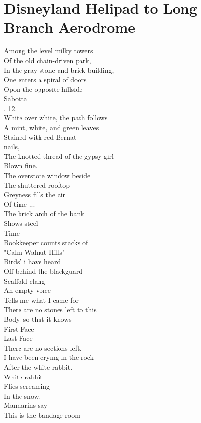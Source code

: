 \documentclass[smalldemyvopaper,11pt,twoside,onecolumn,openright,extrafontsizes]{memoir}
\begin{document}
\chapter{Disneyland Helipad to Long Branch Aerodrome}
Among the level milky towers
\\Of the old chain-driven park,
\\In the gray stone and brick building,
\\One enters a spiral of doors
\\Opon the opposite hillside
\\Sabotta
\\, 12.
\\White over white, the path follows
\\A mint, white, and green leaves
\\Stained with red Bernat
\\nails,
\\The knotted thread of the gypsy girl
\\Blown fine.
\\The overstore window beside
\\The shuttered rooftop
\\Greyness fills the air
\\Of time ...
\\The brick arch of the bank
\\Shows steel
\\Time
\\Bookkeeper counts stacks of
\\"Calm Walnut Hills"
\\Birds' i have heard
\\Off behind the blackguard
\\Scaffold clang
\\An empty voice
\\Tells me what I came for
\\There are no stones left to this
\\Body, so that it knows
\\First Face
\\Last Face
\\There are no sections left.
\\I have been crying in the rock
\\After the white rabbit.
\\White rabbit
\\Flies screaming
\\In the snow.
\\Mandarins say
\\This is the bandage room
\end{document}
